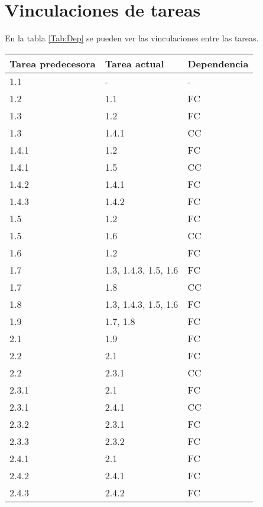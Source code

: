 \documentclass[11pt,a4paper,spanish,twoside]{book}
\begin{document}
\section{Vinculaciones de tareas}
En la tabla \ref{Tab:Dep} se pueden ver las vinculaciones entre las tareas.
\begin{table}[!h]
  \centering
  \small
  \begin{tabular}{|l|p{5cm}|l|}
    \hline
    \textbf{Tarea predecesora} & \textbf{Tarea actual} & \textbf{Dependencia}\\
    \hline \hline
    1.1   & -                    & -  \\
    1.2   & 1.1                  & FC \\
    1.3   & 1.2                  & FC \\
    1.3   & 1.4.1                & CC \\
    1.4.1 & 1.2                  & FC \\
    1.4.1 & 1.5                  & CC \\
    1.4.2 & 1.4.1                & FC \\
    1.4.3 & 1.4.2                & FC \\
    1.5   & 1.2                  & FC \\
    1.5   & 1.6                  & CC \\
    1.6   & 1.2                  & FC \\
    1.7   & 1.3, 1.4.3, 1.5, 1.6 & FC \\
    1.7   & 1.8                  & CC \\
    1.8   & 1.3, 1.4.3, 1.5, 1.6 & FC \\
    1.9   & 1.7, 1.8             & FC \\
    \hline
    2.1   & 1.9                  & FC \\
    2.2   & 2.1                  & FC \\
    2.2   & 2.3.1                & CC \\
    2.3.1 & 2.1                  & FC \\
    2.3.1 & 2.4.1                & CC \\
    2.3.2 & 2.3.1                & FC \\
    2.3.3 & 2.3.2                & FC \\
    2.4.1 & 2.1                  & FC \\
    2.4.2 & 2.4.1                & FC \\
    2.4.3 & 2.4.2                & FC \\

\end{tabular}
\end{table}
\end{document}
